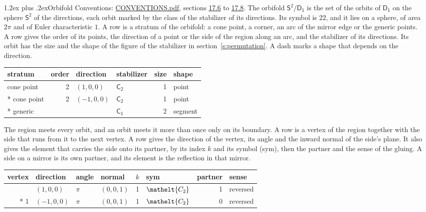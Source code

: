 \documentclass[10pt,a4paper]{article}
\makeatletter
\renewcommand\section{\@startsection{section}{1}{\z@}{-3ex plus -1ex minus -.2ex}%
  {1.2ex plus .2ex}{\normalfont\large\sffamily\bfseries\color{parttitle}}}
\numberwithin{equation}{section}
\newcommand{\eltfont}[1]{{\let\sigma\eltsigma\mathelt{#1}}}
\newcommand{\grp}[1]{\mathsf{#1}}
\newcommand{\cls}[1]{\eltfont{#1}}
\newcommand{\orbname}[1]{#1}
\newcommand{\dirvec}[3]{(#1, #2, #3)}
\newcommand{\twosphere}{\mathsf{S}^{2}}
\makeatother
\begin{document}
\section{Orbifold}\label{s:orbifold}
Conventions: \href{../../CONVENTIONS.pdf}{CONVENTIONS.pdf}, sections \href{../../CONVENTIONS.pdf\#conv.17.6}{17.6} to \href{../../CONVENTIONS.pdf\#conv.17.8}{17.8}.
The orbifold $\twosphere/\grp{D_{1}}$ is the set of the orbits of $\grp{D_{1}}$ on the sphere $\twosphere$ of the directions, each orbit marked by the class of the stabilizer of its directions. Its symbol is $\orbname{22}$, and it lies on a sphere, of area $2\pi$ and of Euler characteristic $1$.
\leavevmode\label{n:head.stratum}\label{n:head.order.point}\label{n:head.direction}\label{n:head.stabilizer}\label{n:head.size.orbit}\label{n:head.shape}A row is a stratum of the orbifold: a cone point, a corner, an arc of the mirror edge or the generic points. A row gives the order of its points, the direction of a point or the side of the region along an arc, and the stabilizer of its directions. Its orbit has the size and the shape of the figure of the stabilizer in section~\ref{s:permutation}. A dash marks a shape that depends on the direction.
{\small\setlength{\tabcolsep}{4pt}\begin{longtable}{@{}lrllrl@{}}\toprule
stratum & order & direction & stabilizer & size & shape\\\midrule\endhead
\bottomrule\endfoot\endlastfoot
cone point & 2 & $\dirvec{1}{0}{0}$ & \href{C2.pdf}{$\grp{C_{2}}$} & 1 & point\\*
cone point & 2 & $\dirvec{-1}{0}{0}$ & \href{C2.pdf}{$\grp{C_{2}}$} & 1 & point\\*
generic &  &  & \href{C1.pdf}{$\grp{C_{1}}$} & 2 & segment\\
\bottomrule\end{longtable}}
\leavevmode\label{n:head.vertex.region}\label{n:head.angle}\label{n:head.normal.side}\label{n:head.partner}\label{n:head.sense}The region meets every orbit, and an orbit meets it more than once only on its boundary. A row is a vertex of the region together with the side that runs from it to the next vertex. A row gives the direction of the vertex, its angle and the inward normal of the side's plane. It also gives the element that carries the side onto its partner, by its index $k$ and its symbol (sym), then the partner and the sense of the gluing. A side on a mirror is its own partner, and its element is the reflection in that mirror.
{\small\setlength{\tabcolsep}{4pt}\begin{longtable}{@{}rlllrlrl@{}}\toprule
vertex & direction & angle & normal & $k$ & sym & partner & sense\\\midrule\endhead
\bottomrule\endfoot\endlastfoot
0 & $\dirvec{1}{0}{0}$ & $\pi$ & $\dirvec{0}{0}{1}$ & 1 & $\cls{C_{2}}$ & 1 & reversed\\*
1 & $\dirvec{-1}{0}{0}$ & $\pi$ & $\dirvec{0}{0}{1}$ & 1 & $\cls{C_{2}}$ & 0 & reversed\\
\bottomrule\end{longtable}}
\end{document}
